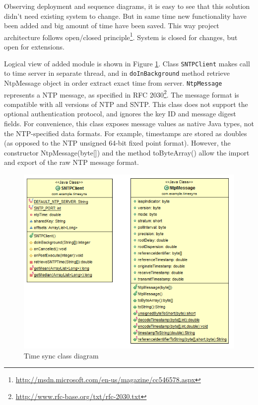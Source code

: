 Observing deployment and sequence diagrams, it is easy to see that this solution didn't need existing system to change. But in same time new functionality have been added and big amount of time have been saved. This way project architecture follows open/closed principle\footnote{\url{http://msdn.microsoft.com/en-us/magazine/cc546578.aspx}}. System is closed for changes, but open for extensions.

Logical view of added module is shown in Figure \ref{fig:Time_Sync_class }. Class \texttt{SNTPClient} makes call to time server in separate thread, and in \texttt{doInBackground} method retrieve NtpMessage object in order extract exact time from server. \texttt{NtpMessage} represents a NTP message, as specified in RFC 2030\footnote{\url{http://www.rfc-base.org/txt/rfc-2030.txt}}. The message format is compatible with all versions of NTP and SNTP. This class does not support the optional authentication protocol, and ignores the key ID and message digest fields. For convenience, this class exposes message values as native Java types, not the NTP-specified data formats. For example, timestamps are stored as doubles (as opposed to the NTP unsigned 64-bit fixed point format). However, the constructor NtpMessage(byte[]) and the method toByteArray() allow the import and export of the raw NTP message format.

\begin{figure}[H]
	\centering
		\includegraphics[width=14cm]{sprint5/sprint5_class_diagram.png}
	\caption{Time sync class diagram}
	\label{fig:Time_Sync_class }
\end{figure}


